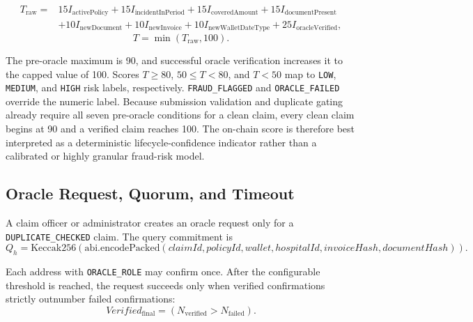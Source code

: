 \begin{equation}
\begin{split}
T_{\mathrm{raw}}={}&15I_{\mathrm{activePolicy}}
+15I_{\mathrm{incidentInPeriod}}
+15I_{\mathrm{coveredAmount}}
+15I_{\mathrm{documentPresent}}\\
&+10I_{\mathrm{newDocument}}
+10I_{\mathrm{newInvoice}}
+10I_{\mathrm{newWalletDateType}}
+25I_{\mathrm{oracleVerified}},
\end{split}
\label{eq:onchain_trust_score}
\end{equation}
\begin{equation}
T = \min(T_{\mathrm{raw}},100).
\end{equation}

The pre-oracle maximum is 90, and successful oracle verification increases it
to the capped value of 100. Scores \(T\geq80\), \(50\leq T<80\), and \(T<50\)
map to \texttt{LOW}, \texttt{MEDIUM}, and \texttt{HIGH} risk labels,
respectively. \texttt{FRAUD\_FLAGGED} and \texttt{ORACLE\_FAILED} override the
numeric label. Because submission validation and duplicate gating already
require all seven pre-oracle conditions for a clean claim, every clean claim
begins at 90 and a verified claim reaches 100. The on-chain score is therefore
best interpreted as a deterministic lifecycle-confidence indicator rather than
a calibrated or highly granular fraud-risk model.

\subsection{Oracle Request, Quorum, and Timeout}

A claim officer or administrator creates an oracle request only for a
\texttt{DUPLICATE\_CHECKED} claim. The query commitment is
\begin{equation}
Q_h=\mathrm{Keccak256}\left(
\mathrm{abi.encodePacked}(claimId,policyId,wallet,hospitalId,invoiceHash,documentHash)
\right).
\label{eq:oracle_query_hash}
\end{equation}

Each address with \texttt{ORACLE\_ROLE} may confirm once. After the configurable
threshold is reached, the request succeeds only when verified confirmations
strictly outnumber failed confirmations:
\begin{equation}
Verified_{\mathrm{final}} =
\left(N_{\mathrm{verified}} > N_{\mathrm{failed}}\right).
\label{eq:oracle_majority}
\end{equation}

